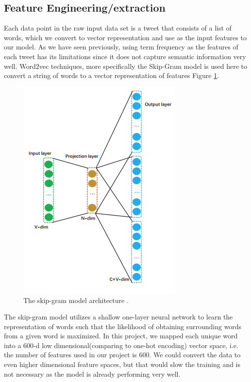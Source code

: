 \documentclass[journal, a4paper]{IEEEtran}
\begin{document}
\subsection{Feature Engineering/extraction}
Each data point in the raw input data set is a tweet that consists of a list of words, which we convert to vector representation and use as the input features to our model. As we have seen previously, using term frequency as the features of each tweet has its limitations since it does not capture semantic information very well. Word2vec techniques, more specifically the Skip-Gram model is used here to convert a string of words to a vector representation of features Figure \ref{fig:3}.
\begin{figure}[!hbt]
	\centering
	\includegraphics[width=0.8\columnwidth]{word2vec.png}
	\caption{ The skip-gram model architecture \cite{Li-lstm}.}
	\label{fig:3}
\end{figure}

The skip-gram model utilizes a shallow one-layer neural network to learn the representation of words such that the likelihood of obtaining surrounding words from a given word is maximized. In this project, we mapped each unique word into a 600-d low dimensional(comparing to one-hot encoding) vector space, i.e. the number of features used in our project is 600. We could convert the data to even higher dimensional feature spaces, but that would slow the training and is not necessary as the model is already performing very well.
\end{document}
